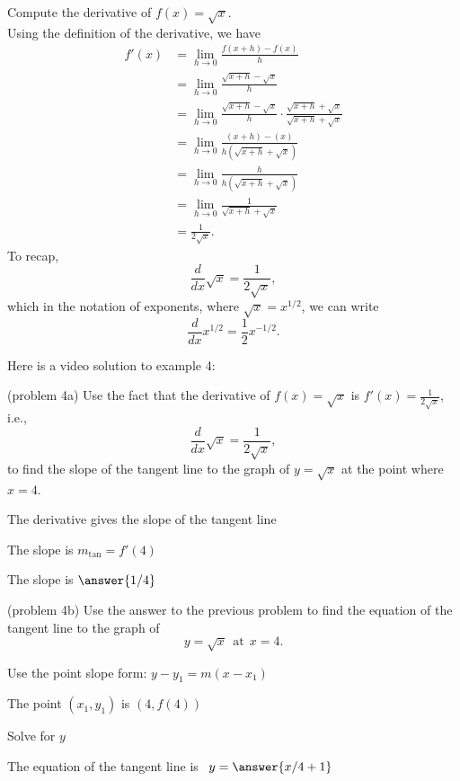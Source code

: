 \documentclass[handout]{ximera}
\begin{document}
\begin{example}[example 4]
Compute the derivative of $f(x) = \sqrt x$.\\
Using the definition of the derivative, we have
\begin{align*}
f'(x) &= \lim_{h \to 0} \frac{f(x+h)-f(x)}{h}\\[5pt]
&= \lim_{h \to 0} \frac{\sqrt{x+h}- \sqrt x}{h}\\[5pt]
&= \lim_{h \to 0} \frac{\sqrt{x+h}- \sqrt x}{h} \cdot \frac{\sqrt{x+h}+ \sqrt x}{\sqrt{x+h}+ \sqrt x} \\[5pt]
&= \lim_{h \to 0} \frac{(x+h) - (x)}{h(\sqrt{x+h}+ \sqrt x)}\\[5pt]
&= \lim_{h \to 0} \frac{h}{h(\sqrt{x+h}+ \sqrt x)}\\[5pt]
&= \lim_{h \to 0} \frac{1}{\sqrt{x+h}+ \sqrt x}\\[5pt]
&=  \frac{1}{2 \sqrt x}.
\end{align*}
To recap, 
\[
\frac{d}{dx}\sqrt{x} = \frac{1}{2\sqrt{x}},
\]
which in the notation of exponents, where $\sqrt x = x^{1/2}$, we can write
\[
\frac{d}{dx}x^{1/2} = \frac12 x^{-1/2}.
\]

\end{example}


Here is a video solution to example 4:
\begin{foldable}
\end{foldable}


\begin{problem}(problem 4a)
Use the fact that the derivative of $f(x) = \sqrt{x}$ is $f'(x) = \frac{1}{2\sqrt{x}}$,
i.e., 
\[
\frac{d}{dx}\sqrt{x} = \frac{1}{2\sqrt{x}},
\]
to find the slope of the tangent line to the graph of 
$y = \sqrt{x}$ at the point where $x = 4$.\\
\begin{hint}
The derivative gives the slope of the tangent line
\end{hint}
\begin{hint}
The slope is $m_{\text{tan}} = f'(4)$
\end{hint}
The slope is $\answer{1/4}$
\end{problem}




\begin{problem}(problem 4b)
Use the answer to the previous problem to find the equation of the tangent line to the graph of 
\[
y = \sqrt{x} \ \ \text{at} \ \ x=4.
\]
\begin{hint}
Use the point slope form: $y-y_1 = m(x-x_1)$
\end{hint}
\begin{hint}
The point $(x_1,y_1)$ is $(4, f(4))$
\end{hint}
\begin{hint}
Solve for $y$
\end{hint}
The equation of the tangent line is \ $y = \answer{x/4 +1}$
\end{problem}
\end{document}
